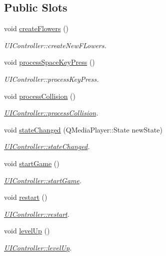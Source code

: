 \subsection*{Public Slots}
\begin{DoxyCompactItemize}
\item 
void \hyperlink{class_u_i_controller_af487d6f8eb4913362bf2c3ddce1d402b}{create\+Flowers} ()
\begin{DoxyCompactList}\small\item\em U\+I\+Controller\+::create\+New\+F\+Lowers. \end{DoxyCompactList}\item 
void \hyperlink{class_u_i_controller_a99978cb677cdab656e0a5ad2b7409eb1}{process\+Space\+Key\+Press} ()
\begin{DoxyCompactList}\small\item\em U\+I\+Controller\+::process\+Key\+Press. \end{DoxyCompactList}\item 
void \hyperlink{class_u_i_controller_a265e9f0a72982a8b09b5e32087da469c}{process\+Collision} ()
\begin{DoxyCompactList}\small\item\em \hyperlink{class_u_i_controller_a265e9f0a72982a8b09b5e32087da469c}{U\+I\+Controller\+::process\+Collision}. \end{DoxyCompactList}\item 
void \hyperlink{class_u_i_controller_ac0b8e708ff0eb1a85c2714e137323e7f}{state\+Changed} (Q\+Media\+Player\+::\+State new\+State)
\begin{DoxyCompactList}\small\item\em \hyperlink{class_u_i_controller_ac0b8e708ff0eb1a85c2714e137323e7f}{U\+I\+Controller\+::state\+Changed}. \end{DoxyCompactList}\item 
void \hyperlink{class_u_i_controller_a5dafae54703cfe08050b2276c5770649}{start\+Game} ()
\begin{DoxyCompactList}\small\item\em \hyperlink{class_u_i_controller_a5dafae54703cfe08050b2276c5770649}{U\+I\+Controller\+::start\+Game}. \end{DoxyCompactList}\item 
void \hyperlink{class_u_i_controller_acee3e71fd6075cc4023df24562ce4fe4}{restart} ()
\begin{DoxyCompactList}\small\item\em \hyperlink{class_u_i_controller_acee3e71fd6075cc4023df24562ce4fe4}{U\+I\+Controller\+::restart}. \end{DoxyCompactList}\item 
void \hyperlink{class_u_i_controller_a612ce6f697961c095a491686f2210b77}{level\+Up} ()
\begin{DoxyCompactList}\small\item\em \hyperlink{class_u_i_controller_a612ce6f697961c095a491686f2210b77}{U\+I\+Controller\+::level\+Up}. \end{DoxyCompactList}\end{DoxyCompactItemize}
